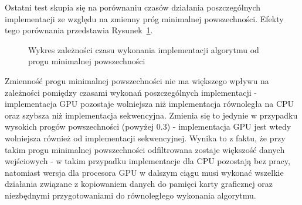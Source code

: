 \documentclass[12pt]{article}
\begin{document}
Ostatni test skupia się na porównaniu czasów działania poszczególnych implementacji ze względu na zmienny próg minimalnej powszechności. Efekty tego porównania przedstawia Rysunek~\ref{chart:minprev-sparse}.

\begin{figure}[H]
\caption{Wykres zależności czasu wykonania implementacji algorytmu od progu minimalnej powszechności}
\label{chart:minprev-sparse}
\end{figure}

Zmienność progu minimalnej powszechności nie ma większego wpływu na zależności pomiędzy czasami wykonań poszczególnych implementacji - implementacja GPU pozostaje wolniejsza niż implementacja równoległa na CPU oraz szybsza niż implementacja sekwencyjna. Zmienia się to jedynie w przypadku wysokich progów powszechności (powyżej 0.3) - implementacja GPU jest wtedy wolniejsza również od implementacji sekwencyjnej. Wynika to z faktu, że przy takim progu minimalnej powszechności odfiltrowana zostaje większość danych wejściowych - w takim przypadku implementacje dla CPU pozostają bez pracy, natomiast wersja dla procesora GPU w dalszym ciągu musi wykonać wszelkie działania związane z kopiowaniem danych do pamięci karty graficznej oraz niezbędnymi przygotowaniami do równoległego wykonania algorytmu.
\end{document}
